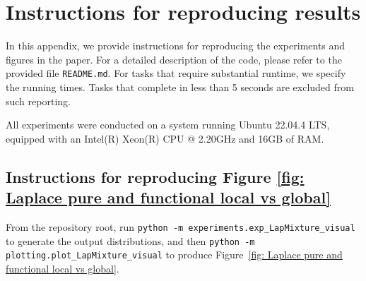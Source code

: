 \documentclass[accepted]{article}
\theoremstyle{plain} %
\theoremstyle{definition}
\theoremstyle{remark}
\begin{document}










\section{Instructions for reproducing results}\label{appendix: reproduce}

In this appendix, we provide instructions for reproducing the experiments and figures in the paper. For a detailed description of the code, please refer to the provided file \texttt{README.md}. For tasks that require substantial runtime, we specify the running times. Tasks that complete in less than 5 seconds are excluded from such reporting.

All experiments were conducted on a system running Ubuntu 22.04.4 LTS, equipped with an Intel(R) Xeon(R) CPU @ 2.20GHz and 16GB of RAM.

\subsection{Instructions for reproducing Figure \ref{fig: Laplace pure and functional local vs global}}

From the repository root, run 
\texttt{python -m experiments.exp\_LapMixture\_visual} 
to generate the output distributions, and then 
\texttt{python -m plotting.plot\_LapMixture\_visual} 
to produce Figure~\ref{fig: Laplace pure and functional local vs global}.
\end{document}
